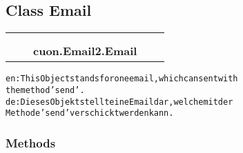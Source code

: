 

\subsection{Class Email}

    \label{cuon:Email2:Email}
\begin{tabular}{cccccc}
\multicolumn{2}{r}{\settowidth{\BCL}{object}\multirow{2}{\BCL}{object}}
&&
  \\\cline{3-3}
  &&\multicolumn{1}{c|}{}
&&
  \\
&&\multicolumn{2}{l}{\textbf{cuon.Email2.Email}}
\end{tabular}

\begin{alltt}

en: This Object stands for one email, which can sent with
    the method 'send'.
de: Dieses Objekt stellt eine Email dar, welche mit der
    Methode 'send' verschickt werden kann.
\end{alltt}



  \subsubsection{Methods}

    \vspace{0.5ex}

